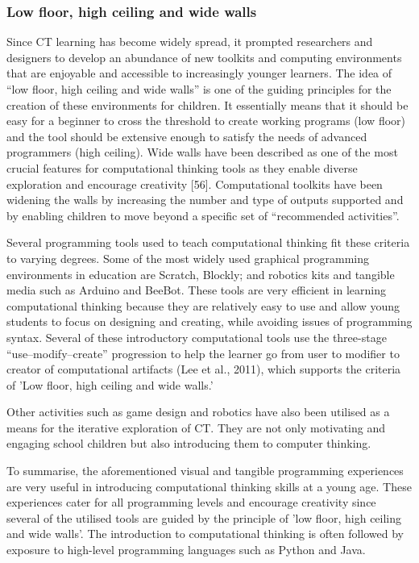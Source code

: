 \documentclass[oneside,%
                    author={Malak Hajji},
                    degree={BSc},
                    title={Designing An Accessible Computational Toolkit For Students},
                  subtitle={With Mixed Visual Abilities}]{dissertation}
\begin{document}
\subsubsection{Low floor, high ceiling and wide walls}

Since CT learning has become widely spread, it prompted researchers and designers to develop an abundance of new toolkits and computing environments that are enjoyable and accessible to increasingly younger learners. The idea of “low floor, high ceiling and wide walls” is one of the guiding principles for the creation of these environments for children. It essentially means that it should be easy for a beginner to cross the threshold to create working programs (low floor) and the tool should be extensive enough to satisfy the needs of advanced programmers (high ceiling).  Wide walls have been described as one of the most crucial features for computational thinking tools as they enable diverse exploration and encourage creativity [56]. Computational toolkits have been widening the walls by increasing the number and type of outputs supported and by enabling children to move beyond a specific set of “recommended activities”. 

Several programming tools used to teach computational thinking fit these criteria to varying degrees. Some of the most widely used graphical programming environments in education are Scratch, Blockly; and robotics kits and tangible media such as Arduino and BeeBot. These tools are very efficient in learning computational thinking because they are relatively easy to use and allow young students to focus on designing and creating, while avoiding issues of programming syntax. Several of these introductory computational tools use the three-stage “use–modify–create” progression to help the learner go from user to modifier to creator of computational artifacts (Lee et al., 2011), which supports the criteria of 'Low floor, high ceiling and wide walls.' 

Other activities such as game design and robotics have also been utilised as a means for the iterative exploration of CT. They are not only motivating and engaging school children but also introducing them to computer thinking. 

To summarise, the aforementioned visual and tangible programming experiences are very useful in introducing computational thinking skills at a young age. These experiences cater for all programming levels and encourage creativity since several of the utilised tools are guided by the principle of 'low floor, high ceiling and wide walls'. The introduction to computational thinking is often followed by exposure to high-level programming languages such as Python and Java.
\end{document}
